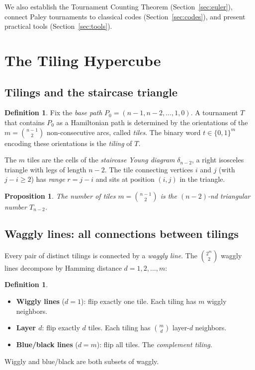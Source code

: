 \documentclass[11pt,a4paper]{article}
\newtheorem{proposition}[theorem]{Proposition}
\theoremstyle{definition}
\newtheorem{definition}[theorem]{Definition}
\theoremstyle{remark}
\begin{document}
We also establish the Tournament Counting Theorem (Section~\ref{sec:euler}), connect Paley tournaments to classical codes (Section~\ref{sec:codes}), and present practical tools (Section~\ref{sec:tools}).

\section{The Tiling Hypercube}
\label{sec:tiling}

\subsection{Tilings and the staircase triangle}

\begin{definition}
Fix the \emph{base path} $P_0 = (n{-}1, n{-}2, \ldots, 1, 0)$. A tournament $T$ that contains $P_0$ as a Hamiltonian path is determined by the orientations of the $m = \binom{n-1}{2}$ non-consecutive arcs, called \emph{tiles}. The binary word $t \in \{0, 1\}^m$ encoding these orientations is the \emph{tiling} of $T$.
\end{definition}

The $m$ tiles are the cells of the \emph{staircase Young diagram} $\delta_{n-2}$, a right isosceles triangle with legs of length $n-2$. The tile connecting vertices $i$ and $j$ (with $j - i \geq 2$) has \emph{range} $r = j - i$ and sits at position $(i, j)$ in the triangle.

\begin{proposition}
The number of tiles $m = \binom{n-1}{2}$ is the $(n{-}2)$-nd triangular number $T_{n-2}$.
\end{proposition}

\subsection{Waggly lines: all connections between tilings}

Every pair of distinct tilings is connected by a \emph{waggly line}. The $\binom{2^m}{2}$ waggly lines decompose by Hamming distance $d = 1, 2, \ldots, m$:

\begin{definition}
\mbox{}
\begin{itemize}
\item \textbf{Wiggly lines} ($d = 1$): flip exactly one tile. Each tiling has $m$ wiggly neighbors.
\item \textbf{Layer $d$}: flip exactly $d$ tiles. Each tiling has $\binom{m}{d}$ layer-$d$ neighbors.
\item \textbf{Blue/black lines} ($d = m$): flip all tiles. The \emph{complement tiling}.
\end{itemize}
Wiggly and blue/black are both subsets of waggly.
\end{definition}
\end{document}
